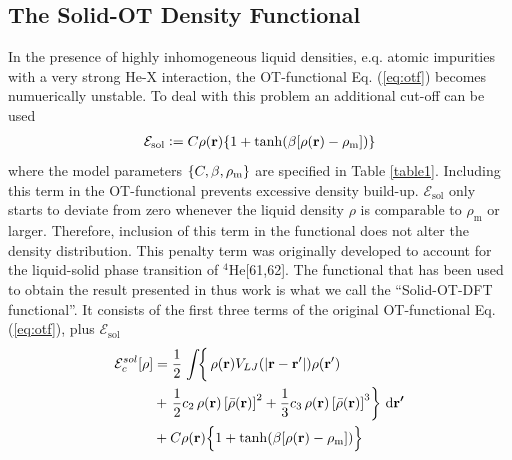 		\subsection{The Solid-OT Density Functional}
			In the presence of highly inhomogeneous liquid densities, e.q. atomic impurities with a very strong He-X interaction, the OT-functional Eq. (\ref{eq:otf}) becomes numuerically unstable. To deal with this problem an additional cut-off can be used
			\begin{align}
				\mathcal{E}_\mathrm{sol} \vcentcolon= C\rho(\bm{\mathrm{r}})\qty{1+\tanh(\beta\qty[\rho(\bm{\mathrm{r}})-\rho_\mathrm{m}])}
			\end{align}
			where the model parameters $\qty{C,\beta,\rho_\mathrm{m}}$ are specified in Table \ref{table1}. Including this term in the OT-functional prevents excessive density build-up. $\mathcal{E}_\mathrm{sol}$ only starts to deviate from zero whenever the liquid density $\rho$ is comparable to $\rho_\mathrm{m}$ or larger. Therefore, inclusion of this term in the functional does not alter the density distribution. This penalty term was originally developed to account for the liquid-solid phase transition of $^4$He[61,62]. The functional that has been used to obtain the result presented in thus work is what we call the ``Solid-OT-DFT functional''. It consists of the first three terms of the original OT-functional Eq. (\ref{eq:otf}), plus $\mathcal{E}_\mathrm{sol}$
			\begin{align}
				{\cal E}_c^{sol}[\rho] &=  
				\frac{1}{2} \left.\int \! \right\{\rho({\bf r}) V_{LJ}(|{\bf r}-{\bf r'}|) \rho({\bf r'}) \nonumber \\
				&+ \left.\frac{1}{2} c_2\, \rho({\bf r}) \left[{\bar \rho}({\bf r}) \right]^2 
				+ \frac{1}{3} c_3 \, \rho({\bf r}) \left[ {\bar \rho}({\bf r}) \right]^3\right\}\,\mathrm{d}{\bm{\mathrm{r'}}} \nonumber \\
				&+ C\rho(\bm{\mathrm{r}})\qty\Big{1+\tanh(\beta\qty[\rho(\bm{\mathrm{r}})-\rho_\mathrm{m}])} \label{eq:solid-otf}
			\end{align}

